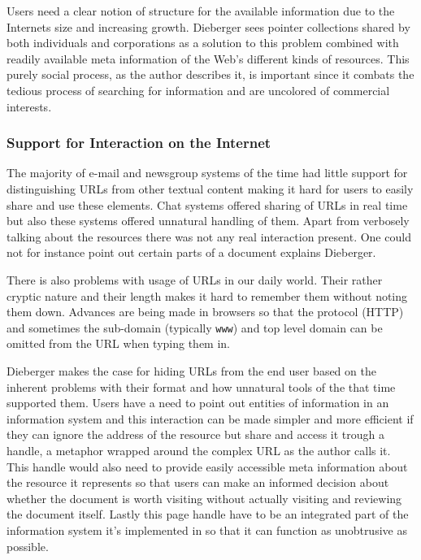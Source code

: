 \documentclass[12pt,a4paper]{article}
\begin{document}
Users need a clear notion of structure for the available information due to
the Internets size and increasing growth. Dieberger sees pointer collections
shared by both individuals and corporations as a solution to this
problem combined with readily available meta information of the Web's
different kinds of resources. This purely social process, as the author
describes it, is important since it combats the tedious process of searching for
information and are uncolored of commercial interests.

\subsubsection{Support for Interaction on the Internet}

The majority of e-mail and newsgroup systems of the time had little support
for distinguishing URLs from other textual content making it hard for users to
easily share and use these elements. Chat systems offered sharing of URLs in
real time but also these systems offered unnatural handling of them.
Apart from verbosely talking about the resources there was not any real
interaction present. One could not for instance point out certain parts of a
document explains Dieberger.

There is also problems with usage of URLs in our daily world. Their rather
cryptic nature and their length makes it hard to remember them without noting
them down. Advances are being made in browsers so that the protocol (HTTP)
and sometimes the sub-domain (typically \texttt{www}) and top level domain can
be omitted from the URL when typing them in.

Dieberger makes the case for hiding URLs from the end user based on the
inherent problems with their format and how unnatural tools of the that time
supported them. Users have a need to point out entities of information in an
information system and this interaction can be made simpler and more efficient
if they can ignore the address of the resource but share and access it trough
a handle, a metaphor wrapped around the complex URL as the author calls it.
This handle would also need to provide easily accessible meta information
about the resource it represents so that users can make an informed decision
about whether the document is worth visiting without actually visiting and
reviewing the document itself. Lastly this page handle have to be an
integrated part of the information system it's implemented in so that it
can function as unobtrusive as possible.
\end{document}
